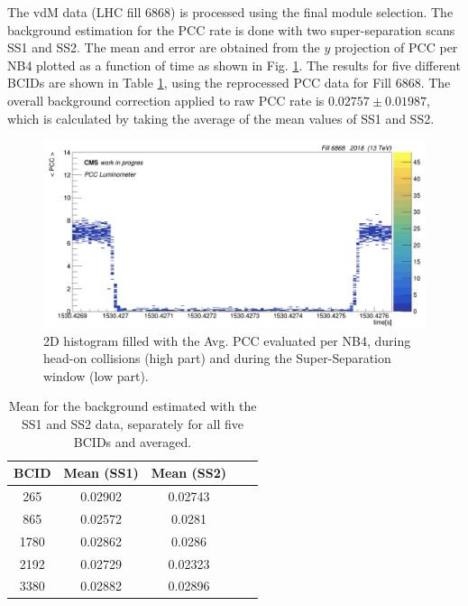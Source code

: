 The vdM data (LHC fill 6868) is processed using the final module selection. The background estimation for the PCC rate is done with two super-separation scans SS1 and SS2. The mean and error are obtained from the $y$ projection of PCC per NB4 plotted as a function of time as shown in Fig. \ref{fig:sigmavis_ss_backg}. The results for five different BCIDs are shown in Table \ref{tab:vdm:SS1_SS2}, using the reprocessed PCC data for Fill 6868. The overall background correction applied to raw PCC rate is $0.02757\pm0.01987$, which is calculated by taking the average of the mean values of SS1 and SS2.


\begin{figure}[!htp]
\centering
\includegraphics[width=1\textwidth]{ashish_thesis/SS1_SS2_bkg_pcc_1.png}
\caption[Background estimation]{2D histogram filled with the Avg. PCC evaluated per NB4, during head-on collisions (high part) and during the Super-Separation window (low part).}
\label{fig:sigmavis_ss_backg}
\end{figure}


\begin{table}
  \begin{center}
    \caption[2018 PCC Background]{Mean for the background estimated with the SS1 and SS2 data, separately for all five BCIDs and averaged.}
    \begin{tabular}{ccccc}
    \textbf{BCID}   & \textbf{Mean (SS1)} & \textbf{Mean (SS2)} \\ \hline
      265     &  0.02902    &  0.02743    \\
        865  &    0.02572  &     0.0281  \\
       1780    &  0.02862   &     0.0286  \\
       2192   &  0.02729  &     0.02323  \\
        3380  &  0.02882  &    0.02896   \\
      \end{tabular}
    \label{tab:vdm:SS1_SS2}
  \end{center}
\end{table}


